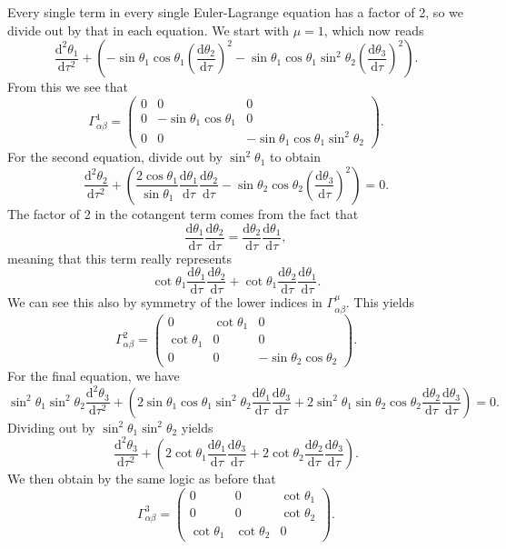 \documentclass[11pt, letterpaper]{article}
\begin{document}
Every single term in every single Euler-Lagrange equation has a factor of 2, so we divide out by that in each equation. We start with $\mu =1$, which now reads
\[
	\frac{\mathrm{d}^2\theta _1}{\mathrm{d}\tau ^2} + \left( - \sin \theta _1 \cos \theta _1 \left( \frac{\mathrm{d}\theta _2}{\mathrm{d}\tau }  \right) ^2 - \sin \theta _1 \cos \theta _1 \sin ^2 \theta _2 \left( \frac{\mathrm{d}\theta _3}{\mathrm{d}\tau }  \right) ^2 \right) 
.\]
From this we see that
\[
	\Gamma ^1_{\alpha \beta } =\begin{pmatrix}
	0 & 0 & 0 \\
	0 & -\sin \theta _1 \cos \theta _1 & 0 \\
	0 & 0 & -\sin \theta _1 \cos \theta _1 \sin ^2\theta _2
	\end{pmatrix}
.\]
For the second equation, divide out by $\sin ^2 \theta _1$ to obtain
\[
	\frac{\mathrm{d}^2\theta _2}{\mathrm{d}\tau ^2} + \left( \frac{2 \cos \theta _1}{\sin \theta _1} \frac{\mathrm{d}\theta _1}{\mathrm{d}\tau } \frac{\mathrm{d}\theta _2}{\mathrm{d}\tau } -  \sin \theta _2 \cos \theta _2 \left( \frac{\mathrm{d}\theta _3}{\mathrm{d}\tau }  \right) ^2\right) =0
.\]
The factor of 2 in the cotangent term comes from the fact that
\[
	\frac{\mathrm{d}\theta _1}{\mathrm{d}\tau } \frac{\mathrm{d}\theta _2}{\mathrm{d}\tau } =\frac{\mathrm{d}\theta _2}{\mathrm{d}\tau } \frac{\mathrm{d}\theta _1}{\mathrm{d}\tau } ,
\]
meaning that this term really represents
\[
	\cot \theta _1 \frac{\mathrm{d}\theta _1}{\mathrm{d}\tau } \frac{\mathrm{d}\theta _2}{\mathrm{d}\tau } + \cot \theta _1 \frac{\mathrm{d}\theta _2}{\mathrm{d}\tau } \frac{\mathrm{d}\theta _1}{\mathrm{d}\tau } 
.\]
We can see this also by symmetry of the lower indices in $\Gamma ^\mu _{\alpha \beta } $. This yields
\[
	\Gamma ^2_{\alpha \beta } =\begin{pmatrix}
	0 & \cot \theta _1  & 0 \\
	\cot \theta _1  & 0 & 0 \\
	0 & 0 & - \sin \theta _2 \cos \theta _2
	\end{pmatrix}
.\]
For the final equation, we have
\[
	\sin ^2\theta _1 \sin ^2\theta _2 \frac{\mathrm{d}^2\theta _3}{\mathrm{d}\tau ^2} + \left( 2 \sin \theta _1 \cos \theta _1 \sin ^2\theta _2 \frac{\mathrm{d}\theta_1}{\mathrm{d}\tau } \frac{\mathrm{d}\theta _3}{\mathrm{d}\tau } + 2 \sin ^2\theta _1 \sin \theta _2 \cos \theta _2 \frac{\mathrm{d}\theta _2}{\mathrm{d}\tau } \frac{\mathrm{d}\theta _3}{\mathrm{d}\tau }  \right) =0
.\]
Dividing out by $\sin ^2\theta _1 \sin ^2\theta _2$ yields
\[
	\frac{\mathrm{d}^2\theta _3}{\mathrm{d}\tau ^2} + \left( 2 \cot \theta _1 \frac{\mathrm{d}\theta _1}{\mathrm{d}\tau } \frac{\mathrm{d}\theta _3}{\mathrm{d}\tau } + 2 \cot \theta _2 \frac{\mathrm{d}\theta _2}{\mathrm{d}\tau } \frac{\mathrm{d}\theta _3}{\mathrm{d}\tau }  \right) 
.\]
We then obtain by the same logic as before that
\[
	\Gamma ^3_{\alpha \beta } =\begin{pmatrix}
	0 & 0 &  \cot \theta _1 \\
	0 & 0 & \cot \theta _2 \\
	\cot \theta _1 & \cot \theta _2 & 0
	\end{pmatrix}
.\]
\end{document}
